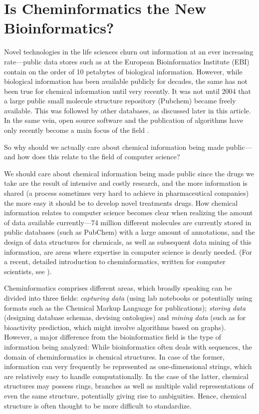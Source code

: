 \documentclass{sig-alternate}
\begin{document}
\section{Is Cheminformatics the New Bioinformatics?}

Novel technologies in the life sciences churn out information at an ever
increasing rate---public data stores such as at the European Bioinformatics
Institute (EBI) contain on the order of 10 petabytes of biological information.
However, while biological information has been available publicly for decades,
the same has not been true for chemical information until very recently. It was
not until 2004 that a large public small molecule structure repository (Pubchem)
became freely available. This was followed by other databases, as discussed later
in this article. In the same vein, open source software and the publication of
algorithms have only recently become a main focus of the field
\cite{faulon2010}.

So why should we actually care about chemical information being made
public---and how does this relate to the field of computer science?

We should care about chemical information being made public since the
drugs we take are the result of intensive and costly research, and the
more information is shared (a process sometimes very hard to achieve
in pharmaceutical companies) the more easy it should be to develop
novel treatments drugs. How chemical information relates to computer
science becomes clear when realizing the amount of data available
currently---74 million different molecules are currently stored in
public databases (such as PubChem) with a large amount of annotations,
and the design of data structures for chemicals, as well as subsequent
data mining of this information, are areas where expertise in computer
science is dearly needed. (For a recent, detailed introduction to
cheminformatics, written for computer scientists, see
\cite{brown2009}).

Cheminformatics comprises different areas, which broadly speaking can be divided
into three fields: \emph{capturing data} (using lab notebooks or potentially using
formats such as the Chemical Markup Language for publications); \emph{storing data}
(designing database schemas, devising ontologies) and \emph{mining data} (such as for
bioactivity prediction, which might involve algorithms based on graphs).
However, a major difference from the bioinformatics field is the type of
information being analyzed: While bioinformatics often deals with sequences, the
domain of cheminformatics is chemical structures. In case of the former,
information can very frequently be represented as one-dimensional strings, which
are relatively easy to handle computationally. In the case of the latter, chemical
structures may possess rings, branches as well as multiple valid representations
of even the same structure, potentially giving rise to ambiguities. Hence,
chemical structure is often thought to be more difficult to standardize. 
\end{document}
